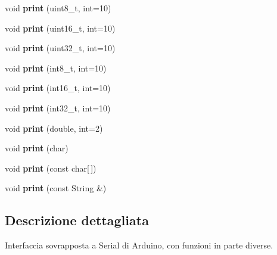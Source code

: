 \begin{DoxyCompactItemize}
\mbox{\label{class_comunicazione_ab68c29658442b719c743ddfd87f8e492}} 
void {\bfseries print} (uint8\+\_\+t, int=10)
\item 
\mbox{\label{class_comunicazione_a0345c34ed88a9cf8eb7ae4a70ab986dc}} 
void {\bfseries print} (uint16\+\_\+t, int=10)
\item 
\mbox{\label{class_comunicazione_acdb11615d1e3bdd9592a0b364f21f271}} 
void {\bfseries print} (uint32\+\_\+t, int=10)
\item 
\mbox{\label{class_comunicazione_ac35f9dcb47a8b5292f4578c3d7223c19}} 
void {\bfseries print} (int8\+\_\+t, int=10)
\item 
\mbox{\label{class_comunicazione_a48a63c3f5b17af403e4241a3c30471c8}} 
void {\bfseries print} (int16\+\_\+t, int=10)
\item 
\mbox{\label{class_comunicazione_a81c380f84e166b1ccf2f6afecbd15cc7}} 
void {\bfseries print} (int32\+\_\+t, int=10)
\item 
\mbox{\label{class_comunicazione_ae8f2d2ad5c82c697b5cda8d93df962f6}} 
void {\bfseries print} (double, int=2)
\item 
\mbox{\label{class_comunicazione_ae503225ba5594109bc13ceae551aed69}} 
void {\bfseries print} (char)
\item 
\mbox{\label{class_comunicazione_ab9662a3e0578530de25aec74e2a5d1d7}} 
void {\bfseries print} (const char\mbox{[}$\,$\mbox{]})
\item 
\mbox{\label{class_comunicazione_afd103fa993003a0d472b872a2c082965}} 
void {\bfseries print} (const String \&)
\end{DoxyCompactItemize}


\subsection{Descrizione dettagliata}
Interfaccia sovrapposta a Serial di Arduino, con funzioni in parte diverse. 

